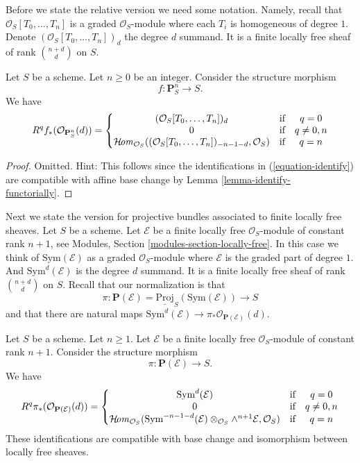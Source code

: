 \noindent
Before we state the relative version we need some notation.
Namely, recall that $\mathcal{O}_S[T_0, \ldots, T_n]$ is a graded
$\mathcal{O}_S$-module where each $T_i$ is homogeneous of degree $1$.
Denote $(\mathcal{O}_S[T_0, \ldots, T_n])_d$ the degree $d$ summand.
It is a finite locally free sheaf of rank $\binom{n + d}{d}$ on $S$.

\begin{lemma}
\label{lemma-cohomology-projective-space-over-base}
Let $S$ be a scheme.
Let $n \geq 0$ be an integer.
Consider the structure morphism
$$
f : \mathbf{P}^n_S \longrightarrow S.
$$
We have
$$
R^qf_*(\mathcal{O}_{\mathbf{P}^n_S}(d)) =
\left\{
\begin{matrix}
(\mathcal{O}_S[T_0, \ldots, T_n])_d & \text{if} & q = 0 \\
0 & \text{if} & q \not = 0, n \\
\mathop{\mathcal{H}\!\mathit{om}}\nolimits_{\mathcal{O}_S}(
(\mathcal{O}_S[T_0, \ldots, T_n])_{- n - 1 - d}, \mathcal{O}_S)
& \text{if} & q = n
\end{matrix}
\right.
$$
\end{lemma}

\begin{proof}
Omitted. Hint: This follows since the identifications in
(\ref{equation-identify}) are compatible with affine base change
by Lemma \ref{lemma-identify-functorially}.
\end{proof}

\noindent
Next we state the version for projective bundles associated to finite locally
free sheaves. Let $S$ be a scheme. Let $\mathcal{E}$ be a finite locally
free $\mathcal{O}_S$-module of constant rank $n + 1$, see
Modules, Section \ref{modules-section-locally-free}.
In this case we think of $\text{Sym}(\mathcal{E})$ as a graded
$\mathcal{O}_S$-module where $\mathcal{E}$ is the graded part of degree $1$.
And $\text{Sym}^d(\mathcal{E})$ is the degree $d$ summand.
It is a finite locally free sheaf of rank $\binom{n + d}{d}$ on $S$.
Recall that our normalization is that
$$
\pi :
\mathbf{P}(\mathcal{E})
=
\underline{\text{Proj}}_S(\text{Sym}(\mathcal{E}))
\longrightarrow
S
$$
and that there are natural maps
$\text{Sym}^d(\mathcal{E}) \to \pi_*\mathcal{O}_{\mathbf{P}(\mathcal{E})}(d)$.

\begin{lemma}
\label{lemma-cohomology-projective-bundle}
Let $S$ be a scheme. Let $n \geq 1$.
Let $\mathcal{E}$ be a finite locally
free $\mathcal{O}_S$-module of constant rank $n + 1$.
Consider the structure morphism
$$
\pi : \mathbf{P}(\mathcal{E}) \longrightarrow S.
$$
We have
$$
R^q\pi_*(\mathcal{O}_{\mathbf{P}(\mathcal{E})}(d)) =
\left\{
\begin{matrix}
\text{Sym}^d(\mathcal{E}) & \text{if} & q = 0 \\
0 & \text{if} & q \not = 0, n \\
\mathop{\mathcal{H}\!\mathit{om}}\nolimits_{\mathcal{O}_S}(
\text{Sym}^{- n - 1 - d}(\mathcal{E})
\otimes_{\mathcal{O}_S}
\wedge^{n + 1}\mathcal{E},
\mathcal{O}_S)
& \text{if} & q = n
\end{matrix}
\right.
$$
These identifications are compatible with base change and
isomorphism between locally free sheaves.
\end{lemma}

